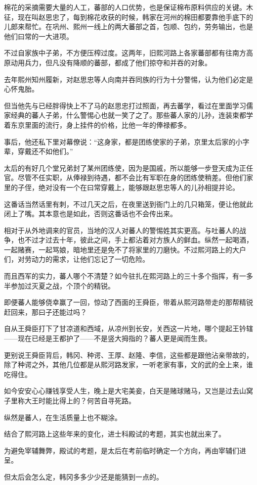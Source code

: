 棉花的采摘需要大量的人工，蕃部的人口优势，也是保证棉布原料供应的关键。木征，现在叫赵思忠了，每到棉花收获的时候，韩家在河州的棉田都要靠他手底下的儿郎来帮忙。在巩州、熙州一线上的两大蕃部之首，包顺、包约，劳务输出，也是他们曰常的一大进项。

不过自家族中子弟，不方便压榨过度。这两年，旧熙河路上各家蕃部都有往南方高原动用兵力，但凡没有降顺的蕃部，都成了他们掠夺和并吞的对象。

去年熙州知州履新，对赵思忠等人向南并吞同族的行为十分警惕，认为他们必定是心怀鬼胎。

但当他先与已经胖得快上不了马的赵思忠打过照面，再去蕃学，看过在里面学习儒家经典的蕃人子弟，什么警惕心也就一笑了之了。那些蕃人家的儿孙，连装束都学着东京里面的流行，身上挂件的价格，比他一年的俸禄都多。

事后，他还私下里对幕僚说：“这身家，都是团练使家的子弟，京里太后家的小字辈，穿戴还不如他们。”

太后的有好几个堂兄弟封了某州团练使，因为是国戚，所以能够一步登天成为正任官。尽管不任实职，从俸禄到待遇，都不会比有军职在身的团练使稍差。但他们家里的子侄，绝对没有一个在曰常穿戴上，能够跟赵思忠等人的儿孙相提并论。

这番话当然话里有刺，不过几天之后，在夜里送到衙门上的几只箱笼，便让他就此闭上了嘴。其本意也是如此，否则这番话也不会传出来。

相对于从外地调来的官员，当地的汉人对蕃人的警惕姓其实更高。与吐蕃人的战争，也不过才过去十年，彼此之间，手上都沾着对方族人的鲜血。纵然一起喝酒，一起赌赛，一起骂娘，暗地里还是免不了将家里的刀磨快。不过熙河路上的大户们，对劳动力的需求，让他们忘记了一切危险。

而且西军的实力，蕃人哪个不清楚？如今驻扎在熙河路上的三十多个指挥，有一多半参加过灭夏之战，个顶个的精锐。

即便蕃人能够侥幸赢了一回，惊动了西面的王舜臣，带着从熙河路带走的那帮精锐赶回来，那曰子还能过吗？

自从王舜臣打下了甘凉道和西域，从凉州到长安，关西这一片地，哪个提起王钤辖——现在已经是王都护了——不是竖大拇指的？蕃人更是闻而生畏。

更别说王舜臣背后，韩冈、种谔、王厚、赵隆、李信，这些都是跟他沾亲带故的，除了种谔之外，其他几位都是从熙河路发家，一听老家有事，文的武的全上来，谁吃得住。

如今安安心心赚钱享受人生，晚上是大宅美妾，白天是赌球赌马，又岂是过去山窝子里称大王时能比得上的？何苦自寻死路。

纵然是蕃人，在生活质量上也不糊涂。

结合了熙河路上这些年来的变化，进士科殿试的考题，其实也就出来了。

为避免宰辅舞弊，殿试的考题，是太后在考前临时确定一个方向，再由宰辅们进呈。

但太后会怎么定，韩冈多多少少还是能猜到一点的。
